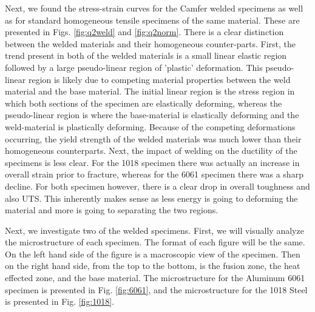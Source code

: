 \documentclass{article}
\begin{document}
Next, we found the stress-strain curves for the Camfer welded specimens as well as for standard homogeneous tensile specimens of the same material. These are presented in Figs. \ref{fig:q2weld} and \ref{fig:q2norm}. There is a clear distinction between the welded materials and their homogeneous counter-parts. First, the trend present in both of the welded materials is a small linear elastic region followed by a large pseudo-linear region of 'plastic' deformation. This pseudo-linear region is likely due to competing material properties between the weld material and the base material. The initial linear region is the stress region in which both sections of the specimen are elastically deforming, whereas the pseudo-linear region is where the base-material is elastically deforming and the weld-material is plastically deforming. Because of the competing deformations occurring, the yield strength of the welded materials was much lower than their homogeneous counterparts. Next, the impact of welding on the ductility of the specimens is less clear. For the 1018 specimen there was actually an increase in overall strain prior to fracture, whereas for the 6061 specimen there was a sharp decline. For both specimen however, there is a clear drop in overall toughness and also UTS. This inherently makes sense as less energy is going to deforming the material and more is going to separating the two regions. 

Next, we investigate two of the welded specimens. First, we will visually analyze the microstructure of each specimen. The format of each figure will be the same. On the left hand side of the figure is a macroscopic view of the specimen. Then on the right hand side, from the top to the bottom, is the fusion zone, the heat effected zone, and the base material. The microstructure for the Aluminum 6061 specimen is presented in Fig. \ref{fig:6061}, and the microstructure for the 1018 Steel is presented in Fig. \ref{fig:1018}.
\end{document}
